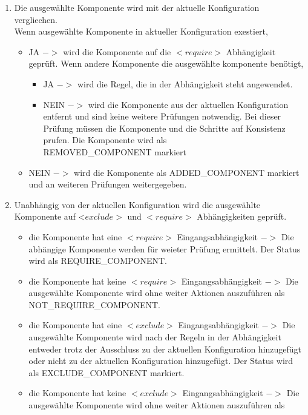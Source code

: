 \documentclass{article}
\begin{document}
\begin{enumerate}
  \item Die ausgew\"ahlte Komponente wird mit der aktuelle Konfiguration
  vergliechen. \\
  Wenn ausgew\"ahlte Komponente in aktueller Konfiguration exestiert,
  \begin{itemize}
    \item JA $->$ wird die Komponente auf die $<require>$ Abh\"angigkeit
    gepr\"uft.
    Wenn andere Komponente die ausgew\"ahlte komponente ben\"otigt,
    \begin{itemize}
      \item JA $->$ wird die Regel, die in der Abh\"angigkeit steht angewendet.
      \item NEIN $->$ wird die Komponente aus der aktuellen Konfiguration
      entfernt und sind keine weitere Pr\"ufungen notwendig. Bei dieser
      Pr\"ufung m\"ussen die Komponente und die Schritte auf Konsistenz
      prufen. Die Komponente wird als \\REMOVED\_COMPONENT markiert
    \end{itemize}
    \item NEIN $->$ wird die Komponente als ADDED\_COMPONENT markiert und
    an weiteren Pr\"ufungen weitergegeben.
  \end{itemize} 
  \item Unabh\"angig von der aktuellen Konfiguration wird die ausgew\"ahlte
  Komponente auf <$exclude>$ und $<require>$ Abh\"angigkeiten gepr\"uft.
  \begin{itemize}
    \item die Komponente hat eine $<require>$ Eingangsabh\"angigkeit $->$ Die
    abh\"angige Komponente werden für weieter Prüfung ermittelt. Der Status wird
    als REQUIRE\_COMPONENT.
    \item die Komponente hat keine $<require>$ Eingangsabh\"angigkeit $->$ Die
    ausgew\"ahlte Komponente wird ohne weiter Aktionen auszuf\"uhren als
    NOT\_REQUIRE\_COMPONENT.
    \item die Komponente hat eine $<exclude>$ Eingangsabh\"angigkeit $->$ Die
    ausgew\"ahlte Komponente wird nach der Regeln in der Abh\"angigkeit
    entweder trotz der Ausschluss zu der aktuellen Konfiguration hinzugef\"ugt
    oder nicht zu der aktuellen Konfiguration hinzugef\"ugt. Der Status wird
    als EXCLUDE\_COMPONENT markiert.
    \item die Komponente hat keine $<exclude>$ Eingangsabh\"angigkeit $->$ Die
    ausgew\"ahlte Komponente wird ohne weiter Aktionen auszuf\"uhren als

\end{itemize}
\end{enumerate}
\end{document}
